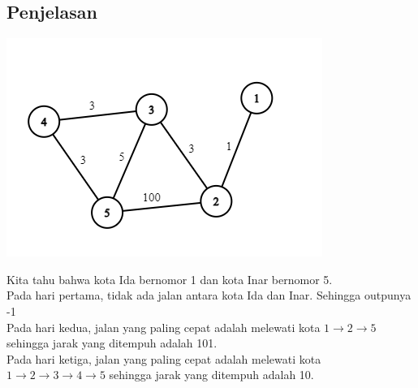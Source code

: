 \documentclass{article}
\begin{document}
\subsection*{Penjelasan}
\begin{center}
 \includegraphics[scale=1.0]{graph_shortest.png}

\end{center}
Kita tahu bahwa kota Ida bernomor 1 dan kota Inar bernomor 5.\\
Pada hari pertama, tidak ada jalan antara kota Ida dan Inar. Sehingga outpunya -1\\
Pada hari kedua, jalan yang paling cepat adalah melewati kota $1 \rightarrow 2 \rightarrow 5$ sehingga jarak yang ditempuh adalah 101.\\ 
Pada hari ketiga, jalan yang paling cepat adalah melewati kota $1 \rightarrow 2 \rightarrow 3 \rightarrow 4 \rightarrow 5$ sehingga jarak yang ditempuh adalah 10.
\end{document}
